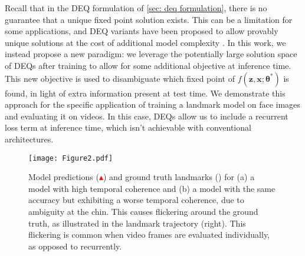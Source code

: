 \documentclass[10pt,twocolumn,letterpaper]{article}
\def\vtheta{{\bm{\theta}}}
\def\vx{{\bm{x}}}
\def\vz{{\bm{z}}}
\begin{document}
Recall that in the DEQ formulation of \cref{sec: deq formulation}, there is no guarantee that a unique fixed point solution exists. This can be a limitation for some applications, and DEQ variants have been proposed to allow provably unique solutions at the cost of additional model complexity \cite{Winston2020MonotoneOperatorDEQs, Pabbaraju2021EstimatingLipConstantsOfMonDEQs}. In this work, we instead propose a new paradigm: we leverage the potentially large solution space of DEQs after training to allow for some additional objective at inference time. This new objective is used to disambiguate which fixed point of $f(\vz, \vx;\vtheta^*)$ is found, in light of extra information present at test time. We demonstrate this approach for the specific application of training a landmark model on face images and evaluating it on videos. In this case, DEQs allow us to include a recurrent loss term at inference time, which isn't achievable with conventional architectures.

\begin{figure*}[t!]
  \centering
   \texttt{[image: Figure2.pdf]}
   \caption{Model predictions (\textcolor{red}{$\blacktriangle$}) and ground truth landmarks (\textcolor{green}{\textbullet}) for (a) a model with high temporal coherence and (b) a model with the same accuracy but exhibiting a worse temporal coherence, due to ambiguity at the chin. This causes flickering around the ground truth, as illustrated in the landmark trajectory (right). This flickering is common when video frames are evaluated individually, as opposed to recurrently.} \label{fig:high flicker vs low flicker}
\end{figure*}
\end{document}
